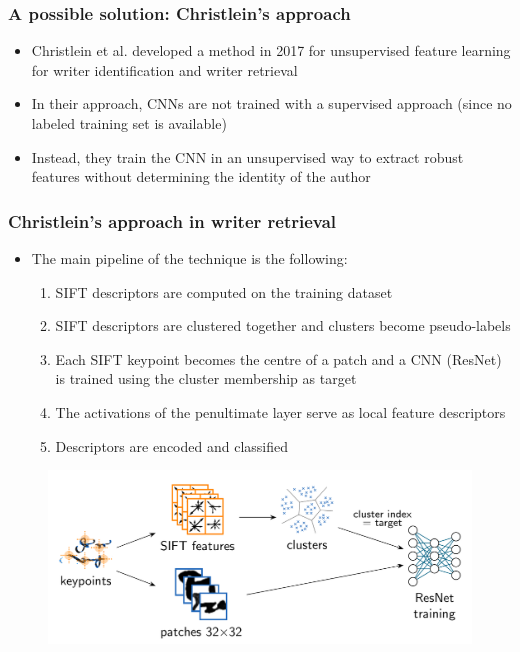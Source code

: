 \documentclass{beamer}
\begin{document}
\begin{frame}
	\frametitle{A possible solution: Christlein's approach}
	\begin{itemize}
		\item Christlein et al. developed a method in 2017 for unsupervised feature learning for writer identification and writer retrieval
		\item In their approach, CNNs are not trained with a supervised approach (since no labeled training set is available)
		\item Instead, they train the CNN in an unsupervised way to extract robust features without determining the identity of the author
	\end{itemize}
\end{frame}
\begin{frame}
	\frametitle{Christlein's approach in writer retrieval}
\begin{itemize}
	\item The main pipeline of the technique is the following:
	\begin{enumerate}
		\item SIFT descriptors are computed on the training dataset
		\item SIFT descriptors are clustered together and clusters become pseudo-labels
		\item Each SIFT keypoint becomes the centre of a patch and a CNN (ResNet) is trained using the cluster membership as target
		\item The activations of the penultimate layer serve as local feature descriptors
		\item Descriptors are encoded and classified
	\end{enumerate}
\end{itemize}
\begin{figure}[h]
	\centering
	\includegraphics[width=0.7\linewidth]{img/christlein2}
	\label{fig:christlein2}
\end{figure}
\end{frame}
\end{document}
